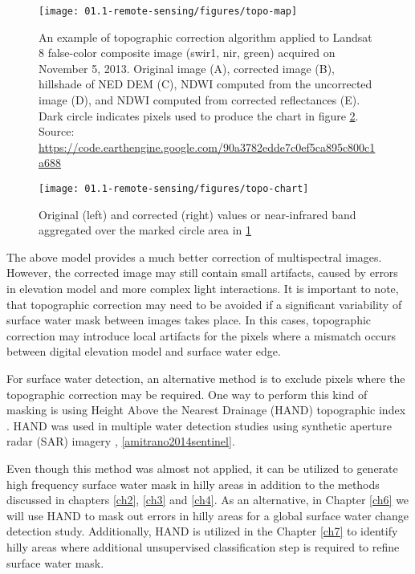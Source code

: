 \begin{figure}[H]
	\texttt{[image: 01.1-remote-sensing/figures/topo-map]}
	\caption{An example of topographic correction algorithm \cite{tan2013improved} applied to Landsat 8 false-color composite image (swir1, nir, green) acquired on November 5, 2013. Original image (A), corrected image (B), hillshade of NED DEM (C), NDWI computed from the uncorrected image (D), and NDWI computed from corrected reflectances (E). Dark circle indicates pixels used to produce the chart in figure \ref{fig:ch1-topo-chart}.  Source: \url{https://code.earthengine.google.com/90a3782edde7c0ef5ca895c800c1a688}}
	\label{fig:ch1-topo-map}
\end{figure}


\begin{figure}[H]
	\texttt{[image: 01.1-remote-sensing/figures/topo-chart]}
	\caption{Original (left) and corrected (right) values or near-infrared band aggregated over the marked circle area in \protect \ref{fig:ch1-topo-map}}
	\label{fig:ch1-topo-chart}
\end{figure}


The above model provides a much better correction of multispectral images. However, the corrected image may still contain small artifacts, caused by errors in elevation model and more complex light interactions. It is important to note, that topographic correction may need to be avoided if a significant variability of surface water mask between images takes place. In this cases, topographic correction may introduce local artifacts for the pixels where a mismatch occurs between digital elevation model and surface water edge.

For surface water detection, an alternative method is to exclude pixels where the topographic correction may be required. One way to perform this kind of masking is using Height Above the Nearest Drainage (HAND) topographic index \cite{Renno2008, Nobre2011}. HAND was used in multiple water detection studies using synthetic aperture radar (SAR) imagery \citep{Eilander2014}, \ref{amitrano2014sentinel}. 


Even though this method was almost not applied, it can be utilized to generate high frequency surface water mask in hilly areas in addition to the methods discussed in chapters \ref{ch2}, \ref{ch3} and \ref{ch4}. As an alternative, in Chapter \ref{ch6} we will use HAND to mask out errors in hilly areas for a global surface water change detection study. Additionally, HAND is utilized in the Chapter \ref{ch7} to identify hilly areas where additional unsupervised classification step is required to refine surface water mask.

